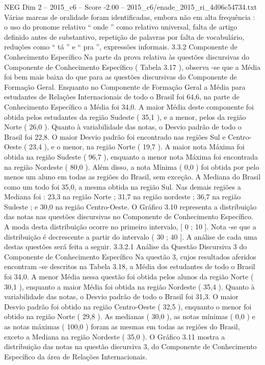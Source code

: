 \begin{textsample}{NEG Dim 2 – 2015\_c6 – Score -2.00 – 2015\_c6/enade\_2015\_ri\_4d06c54734.txt}
Várias marcas de oralidade foram identificadas, embora não em alta frequência : o uso do pronome relativo “ onde ” como relativo universal, falta de artigo definido antes de substantivo, repetição de palavras por falta de vocabulário, reduções como “ tá ” e “ pra ”, expressões informais. 3.3.2 Componente de Conhecimento Específico Na parte da prova relativa às questões discursivas do Componente de Conhecimento Específico ( Tabela 3.17 ), observa -se que a Média foi bem mais baixa do que para as questões discursivas do Componente de Formação Geral.
Enquanto no Componente de Formação Geral a Média para estudantes de Relações Internacionais de todo o Brasil foi 64,6, na parte de Conhecimento Específico a Média foi 34,0.
A maior Média deste componente foi obtida pelos estudantes da região Sudeste ( 35,1 ), e a menor, pelos da região Norte ( 26,0 ).
Quanto à variabilidade das notas, o Desvio padrão de todo o Brasil foi 22,8.
O maior Desvio padrão foi encontrado nas regiões Sul e Centro-Oeste ( 23,4 ), e o menor, na região Norte ( 19,7 ).
A maior nota Máxima foi obtida na região Sudeste ( 96,7 ), enquanto a menor nota Máxima foi encontrada na região Nordeste ( 80,0 ).
Além disso, a nota Mínima ( 0,0 ) foi obtida por pelo menos um aluno em todas as regiões do Brasil, sem exceção.
A Mediana do Brasil como um todo foi 35,0, a mesma obtida na região Sul.
Nas demais regiões a Mediana foi : 23,3 na região Norte ; 31,7 na região nordeste ; 36,7 na região Sudeste ; e 30,0 na região Centro-Oeste.
O Gráfico 3.10 representa a distribuição das notas nas questões discursivas no Componente de Conhecimento Específico.
A moda desta distribuição ocorre no primeiro intervalo, [ 0 ; 10 ].
Nota -se que a distribuição é decrescente a partir do intervalo ( 30 ; 40 ].
A análise de cada uma destas questões será feita a seguir. 3.3.2.1 Análise da Questão Discursiva 3 do Componente de Conhecimento Específico Na questão 3, cujos resultados aferidos encontram -se descritos na Tabela 3.18, a Média dos estudantes de todo o Brasil foi 34,0.
A menor Média nessa questão foi obtida pelos alunos da região Norte ( 30,1 ), enquanto a maior Média foi obtida na região Nordeste ( 35,4 ).
Quanto à variabilidade das notas, o Desvio padrão de todo o Brasil foi 31,3.
O maior Desvio padrão foi obtido na região Centro-Oeste ( 32,5 ), enquanto o menor foi obtido na região Norte ( 29,8 ).
As medianas ( 30,0 ), as notas mínimas ( 0,0 ) e as notas máximas ( 100,0 ) foram as mesmas em todas as regiões do Brasil, exceto a Mediana na região Nordeste ( 35,0 ).
O Gráfico 3.11 mostra a distribuição das notas na questão discursiva 3, do Componente de Conhecimento Específico da área de Relações Internacionais.

\end{textsample}
